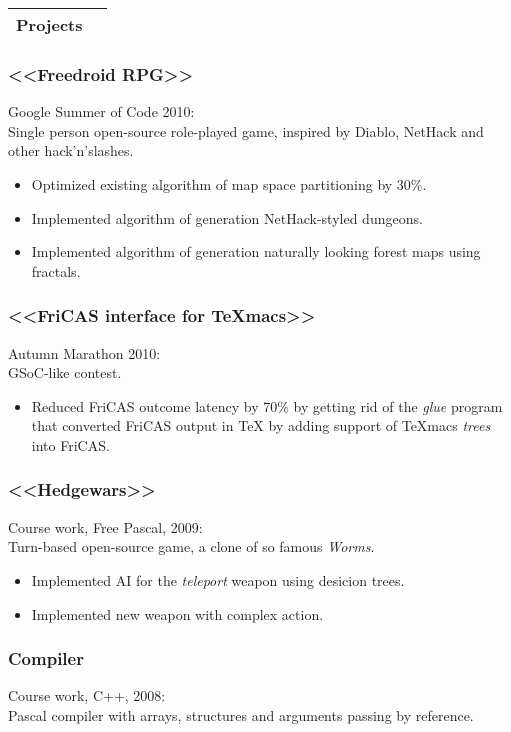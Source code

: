 \documentclass[a4paper]{article}
\begin{document}
	\begin{tabularx}{\textwidth}{@{}lX}
		\textbf{\large Projects}\\
		\hline\hline
	\end{tabularx}
		\begin{multicols}{2}
			\raggedcolumns
			\subsubsection*{<<Freedroid RPG>>}
			Google Summer of Code 2010:\\
			Single person open-source role-played game, inspired by Diablo, NetHack and other hack'n'slashes.
			\begin{itemize}
				\item Optimized existing algorithm of map space partitioning by 30\%.
				\item Implemented algorithm of generation NetHack-styled dungeons.
				\item Implemented algorithm of generation naturally looking forest maps using fractals.
			\end{itemize}
			\subsubsection*{<<FriCAS interface for TeXmacs>>}
			Autumn Marathon 2010:\\
			GSoC-like contest.
			\begin{itemize}
				\item Reduced FriCAS outcome latency by 70\% by getting rid of the \emph{glue} program that converted FriCAS output in \TeX{} by adding support of TeXmacs \emph{trees} into FriCAS.
			\end{itemize}

			\columnbreak

			\subsubsection*{<<Hedgewars>>}
			Course work, Free Pascal, 2009:\\
			Turn-based open-source game, a clone of so famous \emph{Worms}.
			\begin{itemize}
				\item Implemented AI for the \emph{teleport} weapon using desicion trees.
				\item Implemented new weapon with complex action.
			\end{itemize}
			
			\subsubsection*{Compiler}
			Course work, C++, 2008:\\
			Pascal compiler with arrays, structures and arguments passing by reference.
		\end{multicols}
\end{document}
